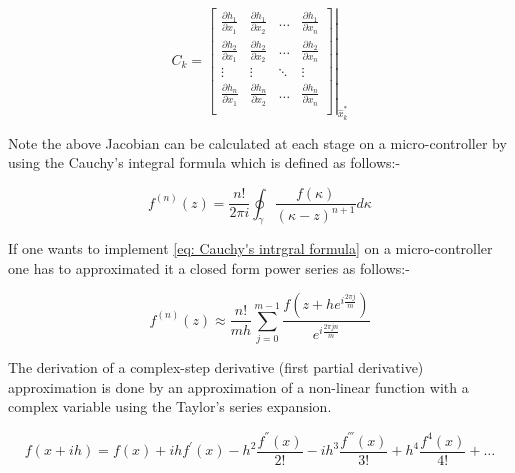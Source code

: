 \begin{equation}
C_k=\left.\left[\begin{array}{cccc}
\frac{\partial h_{1}}{\partial x_1} &\frac{\partial h_{1}}{\partial x_2} &\dots& \frac{\partial h_{1}}{\partial x_n}\\
\frac{\partial h_{2}}{\partial x_1} &\frac{\partial h_{2}}{\partial x_2} &\dots& \frac{\partial h_{2}}{\partial x_n}\\
\vdots& \vdots& \ddots &\vdots\\
\frac{\partial h_{n}}{\partial x_1} &\frac{\partial h_{n}}{\partial x_2} &\dots&\frac{\partial h_{n}}{\partial x_n} \\
\end{array}\right]\right|_{\hat{x}_k^*} \label{eq: jacobain of hx}
\end{equation}

Note the above Jacobian can be calculated at each stage on a micro-controller by using the Cauchy’s integral
formula which is defined as follows\cite{Jacobain_approx_paper}:-


\begin{equation}
f^{(n)}(z) = \frac{n!}{2\pi i}\oint_\gamma \frac{f(\kappa)}{(\kappa - z)^{n+1}}d\kappa \label{eq: Cauchy's intrgral formula}
\end{equation}

If one wants to implement \eqref{eq: Cauchy's intrgral formula} on a micro-controller one has to approximated it a closed form power series as follows:-

\begin{equation}
f^{(n)}(z) \approx \frac{n!}{mh} \sum_{j=0}^{m-1}\frac{f(z+h e^{i\frac{2 \pi j}{m}})}{e^{i\frac{2 \pi j n}{m}}}
\end{equation}

The derivation of a complex-step derivative (first partial derivative) approximation is done by an approximation of a non-linear function with a complex variable using the Taylor's series expansion.

\begin{equation}
f(x+ih) = f(x) + ihf^{'} (x) - h^2\frac{f^{''}(x)}{2!}- ih^3\frac{f^{'''}(x)}{3!}+h^4\frac{f^{4}(x)}{4!} + \dots
\end{equation}

